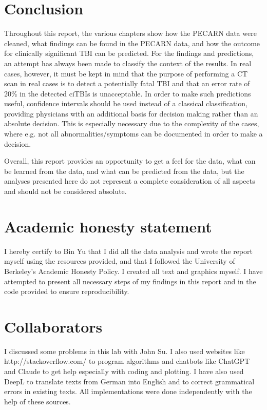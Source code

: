 \documentclass[10pt,letterpaper]{article}
\begin{document}
\section{Conclusion}\label{conclusion}

Throughout this report, the various chapters show how the PECARN data were cleaned, what findings can be found in the PECARN data, and how the outcome for clinically significant TBI can be predicted. For the findings and predictions, an attempt has always been made to classify the context of the results. In real cases, however, it must be kept in mind that the purpose of performing a CT scan in real cases is to detect a potentially fatal TBI and that an error rate of 20\% in the detected ciTBIs is unacceptable. In order to make such predictions useful, confidence intervals should be used instead of a classical classification, providing physicians with an additional basis for decision making rather than an absolute decision. This is especially necessary due to the complexity of the cases, where e.g. not all abnormalities/symptoms can be documented in order to make a decision.

Overall, this report provides an opportunity to get a feel for the data, what can be learned from the data, and what can be predicted from the data, but the analyses presented here do not represent a complete consideration of all aspects and should not be considered absolute.

\section{Academic honesty statement}\label{academic-honesty-statement}

I hereby certify to Bin Yu that I did all the data analysis and wrote the report myself using the resources provided, and that I followed the University of Berkeley's Academic Honesty Policy. I created all text and graphics myself. I have attempted to present all necessary steps of my findings in this report and in the code provided to ensure reproducibility.

\section{Collaborators}\label{collaborators}

I discussed some problems in this lab with John Su. I also used websites like http://stackoverflow.com/ to program algorithms and chatbots like ChatGPT and Claude to get help especially with coding and plotting. I have also used DeepL to translate texts from German into English and to correct grammatical errors in existing texts.  All implementations were done independently with the help of these sources.
\end{document}
